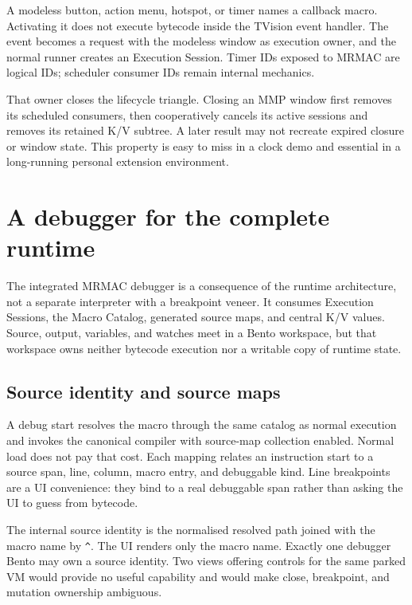 \documentclass[a4paper,10pt,twoside,openany]{book}
\newcommand{\mrmac}{\textsc{MRMAC}}
\begin{document}
A modeless button, action menu, hotspot, or timer names a callback macro.
Activating it does not execute bytecode inside the TVision event handler. The
event becomes a request with the modeless window as execution owner, and the
normal runner creates an Execution Session. Timer IDs exposed to \mrmac{} are
logical IDs; scheduler consumer IDs remain internal mechanics.

That owner closes the lifecycle triangle. Closing an MMP window first removes
its scheduled consumers, then cooperatively cancels its active sessions and
removes its retained K/V subtree. A later result may not recreate expired
closure or window state. This property is easy to miss in a clock demo and
essential in a long-running personal extension environment.

\chapter{A debugger for the complete runtime}
\label{ch:mrmac-debugger}

The integrated \mrmac{} debugger is a consequence of the runtime architecture,
not a separate interpreter with a breakpoint veneer. It consumes Execution
Sessions, the Macro Catalog, generated source maps, and central K/V values.
Source, output, variables, and watches meet in a Bento workspace, but that
workspace owns neither bytecode execution nor a writable copy of runtime
state.

\section{Source identity and source maps}

A debug start resolves the macro through the same catalog as normal execution
and invokes the canonical compiler with source-map collection enabled. Normal
load does not pay that cost. Each mapping relates an instruction start to a
source span, line, column, macro entry, and debuggable kind. Line breakpoints
are a UI convenience: they bind to a real debuggable span rather than asking
the UI to guess from bytecode.

The internal source identity is the normalised resolved path joined with the
macro name by \texttt{\^{}}. The UI renders only the macro name. Exactly one
debugger Bento may own a source identity. Two views offering controls for the
same parked VM would provide no useful capability and would make close,
breakpoint, and mutation ownership ambiguous.
\end{document}

